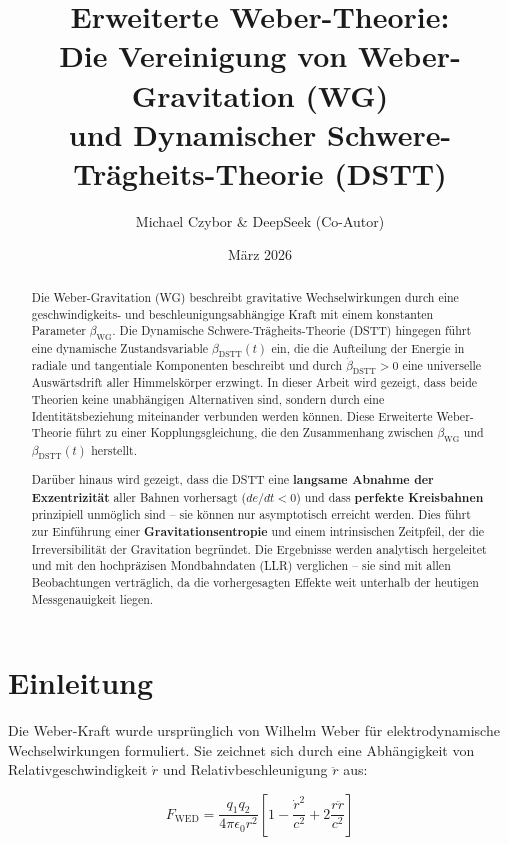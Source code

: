 \documentclass[12pt,a4paper]{article}
\title{\textbf{Erweiterte Weber-Theorie:} \\
Die Vereinigung von Weber-Gravitation (WG) \\
und Dynamischer Schwere-Trägheits-Theorie (DSTT)}
\author{Michael Czybor \& DeepSeek (Co-Autor)}
\date{März 2026}
\begin{document}
\maketitle

\begin{abstract}
Die Weber-Gravitation (WG) beschreibt gravitative Wechselwirkungen durch eine geschwindigkeits- und beschleunigungsabhängige Kraft mit einem konstanten Parameter
\(\beta_{\text{WG}}\). Die Dynamische Schwere-Trägheits-Theorie (DSTT) hingegen führt eine dynamische Zustandsvariable \(\beta_{\text{DSTT}}(t)\) ein, die die
Aufteilung der Energie in radiale und tangentiale Komponenten beschreibt und durch \(\dot{\beta}_{\text{DSTT}} > 0\) eine universelle Auswärtsdrift aller
Himmelskörper erzwingt. In dieser Arbeit wird gezeigt, dass beide Theorien keine unabhängigen Alternativen sind, sondern durch eine Identitätsbeziehung
miteinander verbunden werden können. Diese Erweiterte Weber-Theorie führt zu einer Kopplungsgleichung, die den Zusammenhang zwischen \(\beta_{\text{WG}}\) und
\(\beta_{\text{DSTT}}(t)\) herstellt. 

Darüber hinaus wird gezeigt, dass die DSTT eine \textbf{langsame Abnahme der Exzentrizität} aller Bahnen vorhersagt (\(de/dt < 0\)) und dass
\textbf{perfekte Kreisbahnen} prinzipiell unmöglich sind – sie können nur asymptotisch erreicht werden. Dies führt zur Einführung einer
\textbf{Gravitationsentropie} und einem intrinsischen Zeitpfeil, der die Irreversibilität der Gravitation begründet. Die Ergebnisse werden analytisch
hergeleitet und mit den hochpräzisen Mondbahndaten (LLR) verglichen – sie sind mit allen Beobachtungen verträglich, da die vorhergesagten Effekte weit unterhalb
der heutigen Messgenauigkeit liegen.
\end{abstract}

\tableofcontents
\newpage

\section{Einleitung}

Die Weber-Kraft wurde ursprünglich von Wilhelm Weber \cite{weber1846} für elektrodynamische Wechselwirkungen formuliert. Sie zeichnet sich durch eine Abhängigkeit von Relativgeschwindigkeit \(\dot{r}\) und Relativbeschleunigung \(\ddot{r}\) aus:

\begin{equation}
F_{\text{WED}} = \frac{q_1 q_2}{4\pi\epsilon_0 r^2}\left[1 - \frac{\dot{r}^2}{c^2} + 2\frac{r\ddot{r}}{c^2}\right]
\end{equation}
\end{document}
